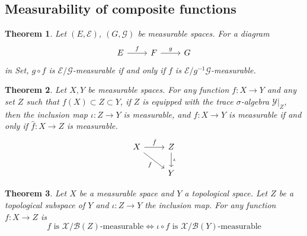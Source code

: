 \documentclass[11pt, a4paper, openany]{book}
\newtheorem{thm}{Theorem}\newtheorem{lem}{Lemma}\newtheorem{crl}{Corollary}
\theoremstyle{definition}
\newtheorem{define}{Definition}\newtheorem{exam}{Example}\newtheorem{remark}{Remark}
\newcommand{\cat}[1]{\textup{\textsf{#1}}}
\newcommand{\ul}{\amalg}\newcommand{\one}{\mathbbm{1}}
\begin{document}
\subsection{Measurability of composite functions}
    \begin{thm}
        Let $(E,\mathscr{E})$, $(G,\mathscr{G})$ be measurable spaces. For a diagram
        \[
            \begin{tikzcd}
                E \ar[r,"f"] & F\ar[r, "g"]& G
            \end{tikzcd}
        \]
        in \cat{Set}, $g\circ f$ is $\mathscr{E}/\mathscr{G}$-measurable if and only if $f$ is $\mathscr{E}/g^{-1}\mathscr{G}$-measurable.
    \end{thm}
    \begin{thm}
        Let $X,Y$ be measurable spaces. For any function $f:X\rightarrow Y$ and any set $Z$ such that $f(X)\subset Z\subset Y$, if $Z$ is equipped with the trace $\sigma$-algebra $\mathscr{Y}|_Z$, then the inclusion map $\iota:Z\rightarrow Y$ is measurable, and $f:X\rightarrow Y$ is measurable if and only if $\hat{f}:X\rightarrow Z$ is measurable.
        \[
            \begin{tikzcd}
                X \ar[dr,"f"'] \ar[r,"\hat{f}"]& Z \ar[d,"\iota"] \\
                & Y
            \end{tikzcd}
        \]
    \end{thm}
    \begin{thm}\label{measurability w.r.t. codomain restricted to a topological subspace}
        Let $X$ be a measurable space and $Y$ a topological space. Let $Z$ be a topological subspace of $Y$ and $\iota:Z\rightarrow Y$ the inclusion map. For any function $f:X\rightarrow Z$ is 
        \[
            f\text{ is $\mathscr{X}/\mathscr{B}(Z)$-measurable}\Longleftrightarrow \iota\circ f\text{ is $\mathscr{X}/\mathscr{B}(Y)$-measurable}
        \]
    \end{thm}
\end{document}

